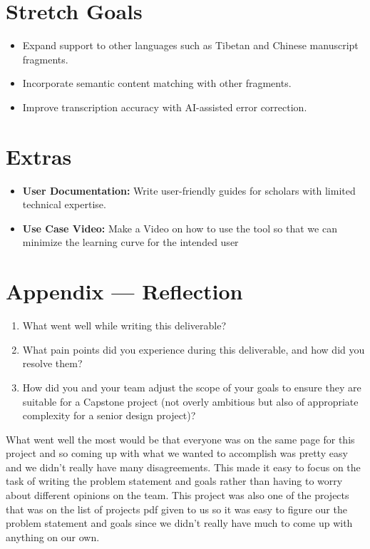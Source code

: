 \documentclass{article}
\begin{document}
\section{Stretch Goals}
\begin{itemize}
  \item Expand support to other languages such as Tibetan and Chinese manuscript fragments.
  \item Incorporate semantic content matching with other fragments.
  \item Improve transcription accuracy with AI-assisted error correction.
\end{itemize}

\section{Extras}
\begin{itemize}
  \item \textbf{User Documentation:} Write user-friendly guides for scholars with limited technical expertise.
  \item \textbf{Use Case Video:} Make a Video on how to use the tool so that we can minimize the learning curve for the intended user
\end{itemize}


\newpage{}

\section*{Appendix --- Reflection}


\begin{enumerate}
    \item What went well while writing this deliverable? 
    \item What pain points did you experience during this deliverable, and how
    did you resolve them?
    \item How did you and your team adjust the scope of your goals to ensure
    they are suitable for a Capstone project (not overly ambitious but also of
    appropriate complexity for a senior design project)?
\end{enumerate}  



\hspace{2em} What went well the most would be that everyone was on the same page for this project and so coming up with what we wanted to accomplish was pretty easy and we didn't really have many disagreements. This made it easy to focus on the task of writing the problem statement and goals rather than having to worry about different opinions on the team. This project was also one of the projects that was on the list of projects pdf given to us so it was easy to figure our the problem statement and goals since we didn't really have much to come up with anything on our own. 
\end{document}
